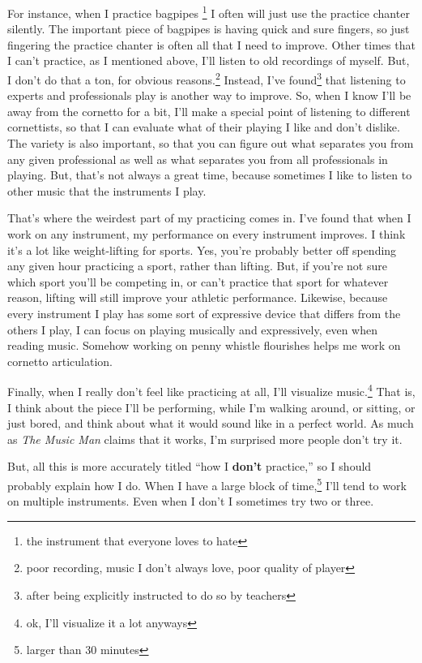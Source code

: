 \documentclass[12pt]{article}[titlepage]
\newcommand{\say}[1]{``#1''}
\newcommand{\1}{\={a}}
\newcommand{\2}{\={e}}
\newcommand{\3}{\={\i}}
\newcommand{\4}{\=o}
\newcommand{\5}{\=u}
\newcommand{\6}{\={A}}
\renewcommand{\,}{\textsuperscript{,}}
\begin{document}
For instance, when I practice bagpipes \footnote{the instrument that everyone loves to hate} I often will just use the practice chanter silently.
The important piece of bagpipes is having quick and sure fingers, so just fingering the practice chanter is often all that I need to improve.
Other times that I can't practice, as I mentioned above, I'll listen to old recordings of myself.
But, I don't do that a ton, for obvious reasons.\footnote{poor recording, music I don't always love, poor quality of player}
Instead, I've found\footnote{after being explicitly instructed to do so by teachers} that listening to experts and professionals play is another way to improve.
So, when I know I'll be away from the cornetto for a bit, I'll make a special point of listening to different cornettists, so that I can evaluate what of their playing I like and don't dislike.
The variety is also important, so that you can figure out what separates you from any given professional as well as what separates you from all professionals in playing.
But, that's not always a great time, because sometimes I like to listen to other music that the instruments I play.

That's where the weirdest part of my practicing comes in.
I've found that when I work on any instrument, my performance on every instrument improves.
I think it's a lot like weight-lifting for sports.
Yes, you're probably better off spending any given hour practicing a sport, rather than lifting.
But, if you're not sure which sport you'll be competing in, or can't practice that sport for whatever reason, lifting will still improve your athletic performance.
Likewise, because every instrument I play has some sort of expressive device that differs from the others I play, I can focus on playing musically and expressively, even when reading music.
Somehow working on penny whistle flourishes helps me work on cornetto articulation.

Finally, when I really don't feel like practicing at all, I'll visualize music.\footnote{ok, I'll visualize it a lot anyways}
That is, I think about the piece I'll be performing, while I'm walking around, or sitting, or just bored, and think about what it would sound like in a perfect world.
As much as \textit{The Music Man} claims that it works, I'm surprised more people don't try it.

But, all this is more accurately titled \say{how I \textbf{don't} practice,} so I should probably explain how I do.
When I have a large block of time,\footnote{larger than 30 minutes} I'll tend to work on multiple instruments.
Even when I don't I sometimes try two or three.
\end{document}
